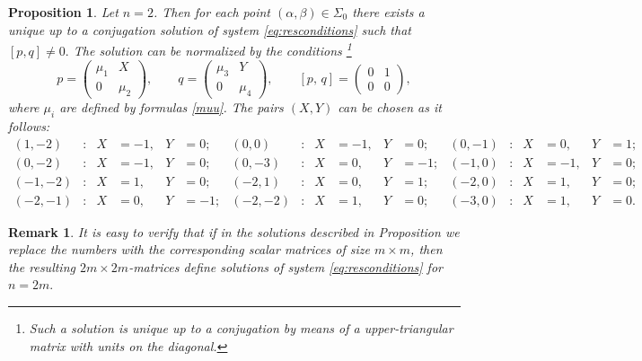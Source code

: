 \documentclass{article}
\theoremstyle{plain}
\newtheorem{proposition}{Proposition}
\newtheorem{remark}{Remark}
\begin{document}
\begin{proposition}\label{prop22} Let $n=2$. Then for each point $(\alpha,\beta)\in \Sigma_0$ there exists a unique up to a conjugation solution of system \eqref{eq:resconditions} such that $[p,q]\ne 0.$ The solution can be normalized by the conditions
\footnote{Such a solution is unique up to a conjugation by means of a upper-triangular matrix with units on the diagonal.} 
$$
p= \begin{pmatrix}
    \mu_1 & X \\
    0 & \mu_2
    \end{pmatrix}, \qquad 
q= \begin{pmatrix}
    \mu_3 & Y \\
    0 & \mu_4
    \end{pmatrix}, \qquad [p,\,q] =  \begin{pmatrix}
    0 & 1 \\
    0 & 0
    \end{pmatrix},
$$
where $\mu_i$ are defined by formulas \eqref{muu}. The pairs $(X, Y)$ can be chosen as it follows:
  \begin{align*}
  (1, -2)&: & 
  X
  &= - 1, 
  & 
  Y&= 0;
  &
  (0, 0)&: & 
  X
  &= - 1, 
  & 
  Y&= 0;
  &
  (0, -1)&: & 
  X
  &= 0, 
  & 
  Y&= 1;
  \\[2mm]
  (0, -2)&: & 
  X
  &= - 1, 
  & 
  Y&= 0;
  &
  (0, -3)&: & 
  X
  &= 0, 
  & 
  Y&= -1;
  &
  (-1, 0)&: & 
  X
  &= {- 1}, 
  & 
  Y&= 0;
  \\[2mm]
  (- 1, -2)&: & 
  X
  &= {1}, 
  & 
  Y&= 0;
  &
  (-2, 1)&: & 
  X
  &= 0, 
  & 
  Y&= 1;
  &
  (-2, 0)&: & 
  X
  &= 1, 
  & 
  Y&= 0;
  \\[2mm]
  (- 2, -1)&: & 
  X
  &=  0, 
  & 
  Y&= -1 ;
  &
  (-2, -2)&: & 
  X
  &= 1, 
  & 
  Y&= 0;
  &
  (-3, 0)&: & 
  X
  &= 1, 
  & 
  Y&= 0.
 \end{align*}
 \end{proposition}

\begin{remark} 
It is easy to verify that if in the solutions described in Proposition \text{\rm \ref{prop22}} we replace the numbers with the corresponding scalar matrices of size $m\times m$, then the resulting $2 m \times 2 m$-matrices define solutions of system \eqref{eq:resconditions} for $n=2 m.$
\end{remark}
\end{document}
